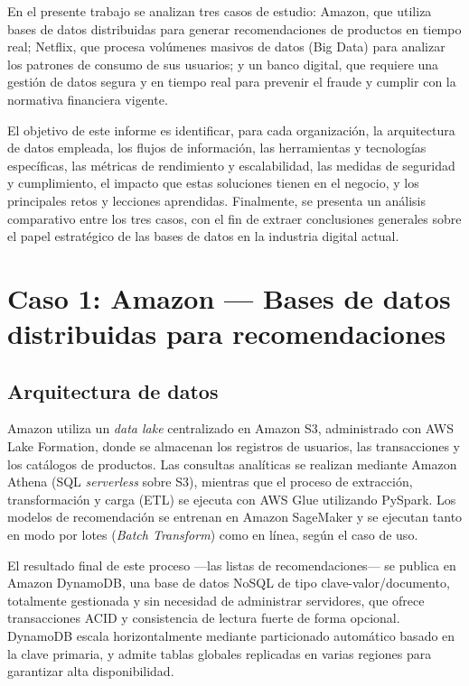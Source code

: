 \documentclass[12pt,a4paper]{article}
\begin{document}
En el presente trabajo se analizan tres casos de estudio: Amazon, que utiliza
bases de datos distribuidas para generar recomendaciones de productos en
tiempo real; Netflix, que procesa volúmenes masivos de datos (Big Data) para
analizar los patrones de consumo de sus usuarios; y un banco digital, que
requiere una gestión de datos segura y en tiempo real para prevenir el fraude
y cumplir con la normativa financiera vigente.

El objetivo de este informe es identificar, para cada organización, la
arquitectura de datos empleada, los flujos de información, las herramientas y
tecnologías específicas, las métricas de rendimiento y escalabilidad, las
medidas de seguridad y cumplimiento, el impacto que estas soluciones tienen en
el negocio, y los principales retos y lecciones aprendidas. Finalmente, se
presenta un análisis comparativo entre los tres casos, con el fin de extraer
conclusiones generales sobre el papel estratégico de las bases de datos en la
industria digital actual.

\section{Caso 1: Amazon --- Bases de datos distribuidas para recomendaciones}

\subsection{Arquitectura de datos}
Amazon utiliza un \textit{data lake} centralizado en Amazon S3, administrado
con AWS Lake Formation, donde se almacenan los registros de usuarios, las
transacciones y los catálogos de productos. Las consultas analíticas se
realizan mediante Amazon Athena (SQL \textit{serverless} sobre S3), mientras
que el proceso de extracción, transformación y carga (ETL) se ejecuta con AWS
Glue utilizando PySpark. Los modelos de recomendación se entrenan en Amazon
SageMaker y se ejecutan tanto en modo por lotes (\textit{Batch Transform})
como en línea, según el caso de uso.

El resultado final de este proceso —las listas de recomendaciones— se publica
en Amazon DynamoDB, una base de datos NoSQL de tipo clave-valor/documento,
totalmente gestionada y sin necesidad de administrar servidores, que ofrece
transacciones ACID y consistencia de lectura fuerte de forma opcional.
DynamoDB escala horizontalmente mediante particionado automático basado en la
clave primaria, y admite tablas globales replicadas en varias regiones para
garantizar alta disponibilidad.
\end{document}
